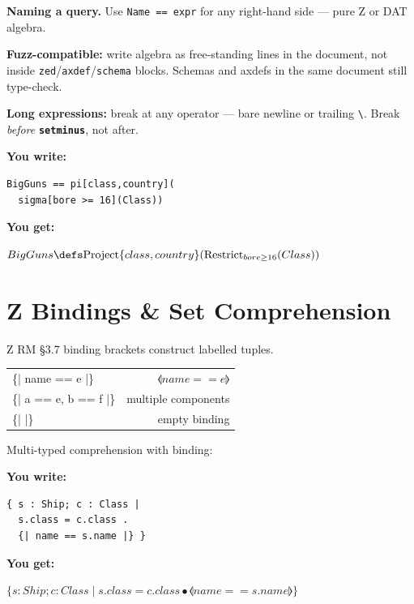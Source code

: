 \documentclass[10pt,landscape,a4paper]{article}
\newcommand{\kw}[1]{\texttt{\bfseries #1}}
\newenvironment{exwrite}%
  {\par\noindent\scriptsize\textbf{You write:}\par\vspace{0pt}\scriptsize}%
  {\vspace{1pt}}
\newenvironment{exget}%
  {\par\noindent\scriptsize\textbf{You get:}\par\vspace{0pt}\small}%
  {\par\vspace{3pt}}
\begin{document}
\begin{multicols}{3}
\smallskip
{\scriptsize\textbf{Naming a query.} Use \texttt{Name == expr} for any right-hand side — pure Z or DAT algebra.}

\smallskip
{\scriptsize\textbf{Fuzz-compatible:} write algebra as free-standing lines in the document, not inside \texttt{zed}/\texttt{axdef}/\texttt{schema} blocks. Schemas and axdefs in the same document still type-check.}

\smallskip
{\scriptsize\textbf{Long expressions:} break at any operator — bare newline or trailing \texttt{\textbackslash}. Break \emph{before} \kw{setminus}, not after.}

\begin{exwrite}
\begin{verbatim}
BigGuns == pi[class,country](
  sigma[bore >= 16](Class))
\end{verbatim}
\end{exwrite}
\begin{exget}
\begin{center}
\noindent$BigGuns \defs \mathrm{Project}\{class,country\}(\mathrm{Restrict}_{bore \geq 16}(Class))$
\end{center}
\end{exget}

\section{Z Bindings \& Set Comprehension}

{\scriptsize Z RM §3.7 binding brackets construct labelled tuples.}

\begin{tabularx}{\columnwidth}{LR}
\{| name == e |\}    & $\lblot name == e \rblot$ \\
\{| a == e, b == f |\} & multiple components \\
\{| |\}              & empty binding \\
\end{tabularx}

\smallskip
{\scriptsize Multi-typed comprehension with binding:}

\begin{exwrite}
\begin{verbatim}
{ s : Ship; c : Class |
  s.class = c.class .
  {| name == s.name |} }
\end{verbatim}
\end{exwrite}
\begin{exget}
\begin{center}
$\{ s : Ship; c : Class \mid s.class = c.class \bullet \lblot name == s.name \rblot \}$
\end{center}
\end{exget}


\end{multicols}
\end{document}
